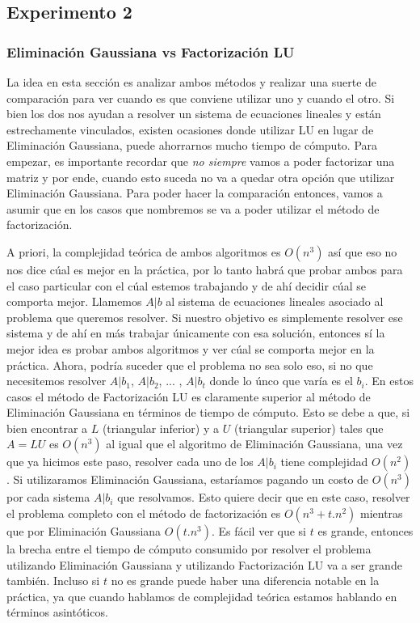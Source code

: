 \subsection{Experimento 2}
\subsubsection{Eliminación Gaussiana vs Factorización LU}
La idea en esta sección es analizar ambos métodos y realizar una suerte de comparación para ver cuando es que conviene utilizar uno y cuando el otro. Si bien los dos nos ayudan a resolver un sistema de ecuaciones lineales y están estrechamente vinculados, existen ocasiones donde utilizar LU en lugar de Eliminación Gaussiana, puede ahorrarnos mucho tiempo de cómputo. Para empezar, es importante recordar que \textit{no siempre} vamos a poder factorizar una matriz y por ende, cuando esto suceda no va a quedar otra opción que utilizar Eliminación Gaussiana. Para poder hacer la comparación entonces, vamos a asumir que en los casos que nombremos se va a poder utilizar el método de factorización.
\par A priori, la complejidad teórica de ambos algoritmos es $O(n^3)$ así que eso no nos dice cúal es mejor en la práctica, por lo tanto habrá que probar ambos para el caso particular con el cúal estemos trabajando y de ahí decidir cúal se comporta mejor. Llamemos $A|b$ al sistema de ecuaciones lineales asociado al problema que queremos resolver. Si nuestro objetivo es simplemente resolver ese sistema y de ahí en más trabajar únicamente con esa solución, entonces sí la mejor idea es probar ambos algoritmos y ver cúal se comporta mejor en la práctica. Ahora, podría suceder que el problema no sea solo eso, si no que necesitemos resolver $A|b_1$, $A|b_2$, ... , $A|b_t$ donde lo únco que varía es el $b_i$. En estos casos el método de Factorización LU es claramente superior al método de Eliminación Gaussiana en términos de tiempo de cómputo. Esto se debe a que, si bien encontrar a $L$ (triangular inferior) y a $U$ (triangular superior) tales que $A = LU$ es $O(n^3)$ al igual que el algoritmo de Eliminación Gaussiana, una vez que ya hicimos este paso, resolver cada uno de los $A|b_i$ tiene complejidad $O(n^2)$. Si utilizaramos Eliminación Gaussiana, estaríamos pagando un costo de $O(n^3)$ por cada sistema $A|b_i$ que resolvamos. Esto quiere decir que en este caso, resolver el problema completo con el método de factorización es $O(n^3 + t.n^2)$ mientras que por Eliminación Gaussiana $O(t.n^3)$. Es fácil ver que si $t$ es grande, entonces la brecha entre el tiempo de cómputo consumido por resolver el problema utilizando Eliminación Gaussiana y utilizando Factorización LU va a ser grande también. Incluso si $t$ no es grande puede haber una diferencia notable en la práctica, ya que cuando hablamos de complejidad teórica estamos hablando en términos asintóticos.
